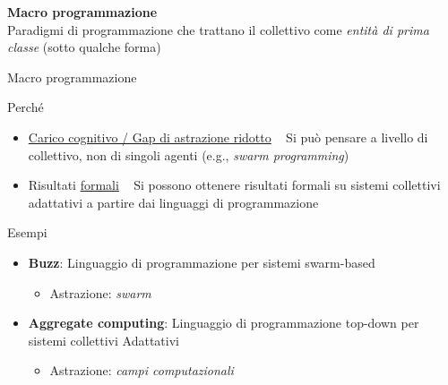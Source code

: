 \documentclass[presentation, 10pt,aspectratio=169]{beamer}\mode<presentation>{\usetheme{AMSBolognaFC}}
\begin{document}
{


\begin{frame}[c]
	
	{
	\color{customfg}

	\begin{center}
	\Large\textbf{Macro programmazione} \\
	Paradigmi di programmazione che trattano il \alert{collettivo} come \emph{entità di prima classe} (sotto qualche forma)
	\end{center}

	\vspace{1cm}	
}
\end{frame}
}
\begin{frame}{Macro programmazione}
	\begin{alertblock}{Perché}
		\begin{itemize}
			\item \underline{Carico cognitivo / Gap di astrazione ridotto} \faArrowRight ~ Si può pensare a livello di collettivo, non di singoli agenti (e.g., \emph{swarm programming})
			\item Risultati \underline{formali} \faArrowRight ~ Si possono ottenere risultati formali su sistemi collettivi adattativi a partire dai linguaggi di programmazione
		\end{itemize}
	\end{alertblock}
	\begin{block}{Esempi}
		\begin{itemize}
			\item \textbf{Buzz}: Linguaggio di programmazione per sistemi swarm-based 
			\begin{itemize}
				\item Astrazione: \emph{swarm}
			\end{itemize}
			\item \alert{\textbf{Aggregate computing}}: Linguaggio di programmazione top-down per sistemi collettivi Adattativi
			\begin{itemize}
				\item Astrazione: \emph{campi computazionali}
			\end{itemize}
		\end{itemize}
	\end{block}
\end{frame}
\end{document}
